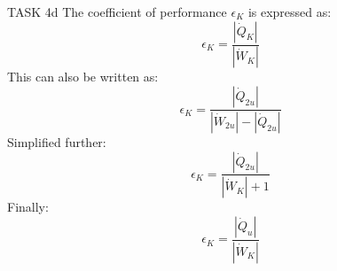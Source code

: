 TASK 4d  
The coefficient of performance \( \epsilon_K \) is expressed as:  
\[
\epsilon_K = \frac{|\dot{Q}_K|}{|\dot{W}_K|}
\]  
This can also be written as:  
\[
\epsilon_K = \frac{|\dot{Q}_{2u}|}{|\dot{W}_{2u}| - |\dot{Q}_{2u}|}
\]  
Simplified further:  
\[
\epsilon_K = \frac{|\dot{Q}_{2u}|}{|\dot{W}_K| + 1}
\]  
Finally:  
\[
\epsilon_K = \frac{|\dot{Q}_u|}{|\dot{W}_K|}
\]  